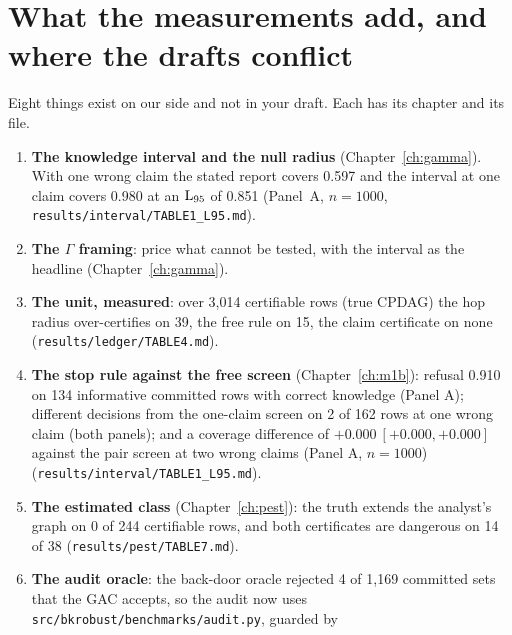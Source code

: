 \begin{antes}
\end{antes}

\section{What the measurements add, and where the drafts conflict}

Eight things exist on our side and not in your draft. Each has its chapter and its file.

\begin{enumerate}[nosep, leftmargin=*]
\item \textbf{The knowledge interval and the null radius} (Chapter~\ref{ch:gamma}). With one wrong claim
  the stated report covers 0.597 and the interval at one claim covers 0.980 at an $\mathrm{L}_{95}$ of 0.851 (Panel~A,
  $n = 1000$, \texttt{results/\allowbreak interval/\allowbreak TABLE1\_L95.md}).
\item \textbf{The $\Gamma$ framing}: price what cannot be tested, with the interval as the headline
  (Chapter~\ref{ch:gamma}).
\item \textbf{The unit, measured}: over 3,014 certifiable rows (true CPDAG) the hop radius over-certifies on
  39, the free rule on 15, the claim certificate on none (\texttt{results/\allowbreak ledger/\allowbreak TABLE4.md}).
\item \textbf{The stop rule against the free screen} (Chapter~\ref{ch:m1b}): refusal 0.910 on 134
  informative committed rows with correct knowledge (Panel A); different decisions from the one-claim
  screen on 2 of 162 rows at one wrong claim (both panels); and a coverage difference of
  $+0.000\ [+0.000, +0.000]$ against the pair screen at two wrong claims (Panel A, $n = 1000$) (\texttt{results/\allowbreak interval/\allowbreak TABLE1\_L95.md}).
\item \textbf{The estimated class} (Chapter~\ref{ch:pest}): the truth extends the analyst's graph on 0 of
  244 certifiable rows, and both certificates are dangerous on 14 of 38 (\texttt{results/\allowbreak pest/\allowbreak TABLE7.md}).
\item \textbf{The audit oracle}: the back-door oracle rejected 4 of 1,169 committed sets that the GAC
  accepts, so the audit now uses \texttt{src/\allowbreak bkrobust/\allowbreak benchmarks/\allowbreak audit.py}, guarded by

\end{enumerate}

